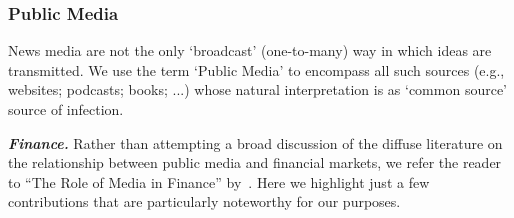 




\subsubsection{Public Media}

News media are not the only `broadcast' (one-to-many) way in which ideas are transmitted.  We use the term `Public Media' to encompass all such sources (e.g., websites;  podcasts;  books; ...) whose natural interpretation is as `common source' source of infection.

\textbf{\textit{Finance.}}  Rather than attempting a broad discussion of the diffuse literature on the relationship between public media and financial markets, we refer the reader to ``The Role of Media in Finance'' by~\cite{TETLOCK2015701}.  Here we highlight just a few contributions that are particularly noteworthy for our purposes. %

